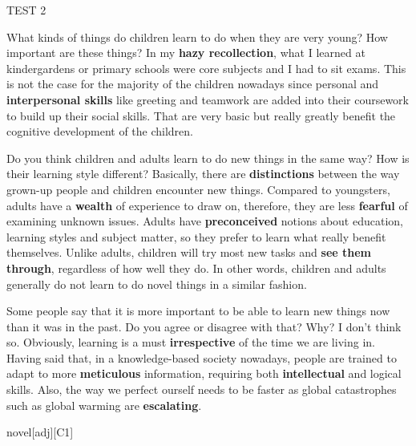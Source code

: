 \begin{glossarymc}[Cambridge 9]
\begin{test}{TEST 2}
    \begin{qa}{What kinds of things do children learn to do when they are very young? How important are these things?}
    In my \textbf{hazy recollection}, what I learned at kindergardens or primary schools were core subjects and I had to sit exams. This is not the case for the majority of the children nowadays since personal and \textbf{interpersonal skills} like greeting and teamwork are added into their coursework to build up their social skills. That are very basic but really greatly benefit the cognitive development of the children.
    \end{qa}

    \begin{qa}{Do you think children and adults learn to do new things in the same way? How is their learning style different?}
    Basically, there are \textbf{distinctions} between the way grown-up people and children encounter new things. Compared to youngsters, adults have a \textbf{wealth} of experience to draw on, therefore, they are less \textbf{fearful} of examining unknown issues. Adults have \textbf{preconceived} notions about education, learning styles and subject matter, so they prefer to learn what really benefit themselves. Unlike adults, children will try most new tasks and \textbf{see them through}, regardless of how well they do. In other words, children and adults generally do not learn to do novel things in a similar fashion.
    \end{qa}

    \begin{qa}{Some people say that it is more important to be able to learn new things now than it was in the past. Do you agree or disagree with that? Why?}
    I don't think so. Obviously, learning is a must \textbf{irrespective} of the time we are living in. Having said that, in a knowledge-based society nowadays, people are trained to adapt to more \textbf{meticulous} information, requiring both \textbf{intellectual} and logical skills. Also, the way we perfect ourself needs to be faster as global catastrophes such as global warming are \textbf{escalating}.
    \end{qa}

        \begin{VocabExplain}[Part 3]
            \begin{ExplainCard}{novel}[adj][C1]
            \end{ExplainCard}


\end{VocabExplain}
\end{test}
\end{glossarymc}
